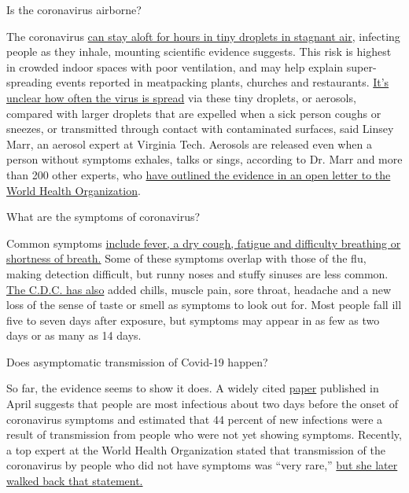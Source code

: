  Is the coronavirus airborne?

The coronavirus
\href{https://www.nytimes3xbfgragh.onion/2020/07/04/health/239-experts-with-one-big-claim-the-coronavirus-is-airborne.html}{can
stay aloft for hours in tiny droplets in stagnant air}, infecting people
as they inhale, mounting scientific evidence suggests. This risk is
highest in crowded indoor spaces with poor ventilation, and may help
explain super-spreading events reported in meatpacking plants, churches
and restaurants.
\href{https://www.nytimes3xbfgragh.onion/2020/07/06/health/coronavirus-airborne-aerosols.html}{It's
unclear how often the virus is spread} via these tiny droplets, or
aerosols, compared with larger droplets that are expelled when a sick
person coughs or sneezes, or transmitted through contact with
contaminated surfaces, said Linsey Marr, an aerosol expert at Virginia
Tech. Aerosols are released even when a person without symptoms exhales,
talks or sings, according to Dr. Marr and more than 200 other experts,
who
\href{https://academic.oup.com/cid/article/doi/10.1093/cid/ciaa939/5867798}{have
outlined the evidence in an open letter to the World Health
Organization}.

 What are the symptoms of coronavirus?

Common symptoms
\href{https://www.nytimes3xbfgragh.onion/article/symptoms-coronavirus.html}{include
fever, a dry cough, fatigue and difficulty breathing or shortness of
breath.} Some of these symptoms overlap with those of the flu, making
detection difficult, but runny noses and stuffy sinuses are less common.
\href{https://www.nytimes3xbfgragh.onion/2020/04/27/health/coronavirus-symptoms-cdc.html}{The
C.D.C. has also} added chills, muscle pain, sore throat, headache and a
new loss of the sense of taste or smell as symptoms to look out for.
Most people fall ill five to seven days after exposure, but symptoms may
appear in as few as two days or as many as 14 days.

 Does asymptomatic transmission of Covid-19 happen?

So far, the evidence seems to show it does. A widely cited
\href{https://www.nature.com/articles/s41591-020-0869-5}{paper}
published in April suggests that people are most infectious about two
days before the onset of coronavirus symptoms and estimated that 44
percent of new infections were a result of transmission from people who
were not yet showing symptoms. Recently, a top expert at the World
Health Organization stated that transmission of the coronavirus by
people who did not have symptoms was ``very rare,''
\href{https://www.nytimes3xbfgragh.onion/2020/06/09/world/coronavirus-updates.html\#link-1f302e21}{but
she later walked back that statement.}

